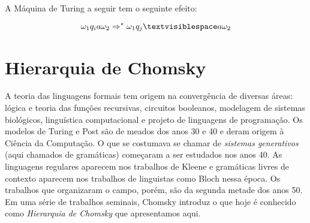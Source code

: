 \begin{example}
  \label{ex:space}
  A Máquina de Turing a seguir tem o seguinte efeito:

  \begin{displaymath}
    \omega_1 q_i a \omega_2 \Rightarrow^* \omega_1 q_j \textvisiblespace a \omega_2
  \end{displaymath}

  
\end{example}


\section*{Hierarquia de Chomsky}

A teoria das linguagens formais tem origem na convergência de diversas áreas:
lógica e teoria das funções recursivas, circuitos booleanos, modelagem de sistemas biológicos, linguística computacional e projeto de linguagens de programação.
Os modelos de Turing e Post são de meados dos anos 30 e 40 e deram origem à Ciência da Computação.
O que se costumava se chamar de {\em sistemas generativos} (aqui chamados de gramáticas) começaram a ser estudados nos anos 40.
As linguagens regulares aparecem nos trabalhos de Kleene e gramáticas livres de contexto aparecem nos trabalhos de linguistas como Bloch nessa época.
Os trabalhos que organizaram o campo, porém, são da segunda metade dos anos 50.
Em uma série de trabalhos seminais, Chomsky introduz o que hoje é conhecido como {\em Hierarquia de Chomsky} que apresentamos aqui.

